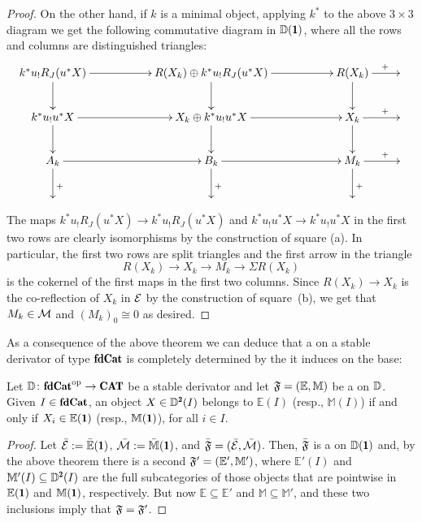 \begin{proof}
On the other hand, if $k$ is a minimal object, applying $k^*$ to the above $3\times 3$ diagram we get the following commutative diagram in $\D(\uno)$, where all the rows and columns are distinguished triangles:
\[
\xymatrix{
k^*u_!R_J(u^*X)\ar[rr]\ar[d]&&R(X_k)\oplus k^*u_!R_J(u^*X)\ar[d]\ar[rr]&&R(X_k)\ar[d]\ar[r]^(.65)+&\\ 
k^*u_!u^*X\ar[rr]\ar[d]&&X_k\oplus k^*u_!u^*X\ar[rr]\ar[d]&&X_k\ar[d]\ar[r]^(.65)+&\\
A_k\ar[d]^(.65)+\ar[rr]&&B_k\ar[d]^(.65)+\ar[rr]&&M_k\ar[d]^(.65)+\ar[r]^(.65)+&\\
&&&&&
}
\]
The maps $k^*u_!R_J(u^*X)\to k^*u_!R_J(u^*X)$ and $k^*u_!u^*X\to k^*u_!u^*X$ in the first two rows are clearly isomorphisms by the construction of square (a).
In particular, the first two rows are split triangles and the first arrow in the triangle 
\[
R(X_k)\to X_k\to M_k\to \Sigma R(X_k)
\] 
is the cokernel of the first maps in the first two columns. Since $R(X_k)\to X_k$ is the co-reflection of $X_k$ in $\mathcal{E}$ by the construction of square~(b), we get that $M_k\in \mathcal{M}$  and $(M_k)_0\cong 0$ as desired.
\end{proof}

As a consequence of the above theorem we can deduce that a \dfs on a stable derivator of type $\fincat$ is completely determined by the \hfs it induces on the base:

\begin{corollary}\label{everything_is_maximal}
Let $\D\colon \fincat^\opp\to \Cat$ be a stable derivator and let $\mathfrak{F}=(\mathbb E,\mathbb M)$ be a \dfs on $\mathbb{D}$. Given $I\in\fincat$, an object $X\in \D^\due(I)$ belongs to $\mathbb E(I)$ (resp., $\mathbb M(I)$) if and only if $X_i\in \mathbb E(\uno)$ (resp., $\mathbb M(\uno)$), for all $i\in I$. 
\end{corollary}
\begin{proof}
Let $\bar\E:=\bar {\mathbb E}(\uno)$, $\bar\M:=\bar {\mathbb M}(\uno)$, and $\bar {\mathfrak{F}}=(\bar {\mathcal{E}},\bar {\mathcal{M}})$. Then, $\bar{\mathfrak{F}}$ is a \hfs on $\D(\uno)$ and, by the above theorem there is a second \dfs $\mathfrak{F}'=(\mathbb E',\mathbb M')$, where $\mathbb E'(I)$ and $\mathbb M'(I)\subseteq \D^\due(I)$ are the full subcategories of those objects that are pointwise in $\mathbb E(\uno)$ and $\mathbb M(\uno)$, respectively. But now $\mathbb E\subseteq \mathbb E'$ and $\mathbb M\subseteq \mathbb M'$, and these two inclusions imply that $\mathfrak{F}=\mathfrak{F}'$.
\end{proof}

